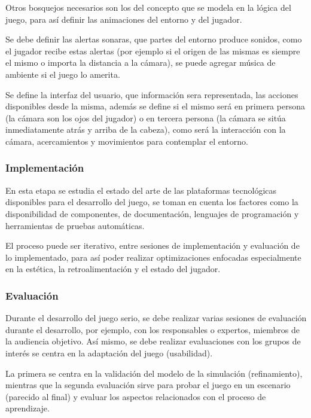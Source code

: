Otros bosquejos necesarios son los del concepto que se modela en la lógica del
juego, para así definir las animaciones del entorno y del jugador.

Se debe definir las alertas sonaras, que partes del entorno produce sonidos,
como el jugador recibe estas alertas (por ejemplo si el origen de las mismas es
siempre el mismo o importa la distancia a la cámara), se puede agregar música de
ambiente si el juego lo amerita.

Se define la interfaz del usuario, que información sera representada, las
acciones disponibles desde la misma, además se define si el mismo será en
primera persona (la cámara son los ojos del jugador) o en tercera persona (la
cámara se sitúa inmediatamente atrás y arriba de la cabeza), como será la
interacción con la cámara, acercamientos y movimientos para contemplar el
entorno.

\subsubsection{Implementación} 

En esta etapa se estudia el estado del arte de las plataformas tecnológicas
disponibles para el desarrollo del juego, se toman en cuenta los factores como
la disponibilidad de componentes, de documentación, lenguajes de programación y
herramientas de pruebas automáticas.

El proceso puede ser iterativo, entre sesiones de implementación y evaluación de
lo implementado, para así poder realizar optimizaciones enfocadas especialmente
en la estética, la retroalimentación y el estado del jugador.

\subsubsection{Evaluación} 

Durante el desarrollo del juego serio, se debe realizar varias sesiones de
evaluación durante el desarrollo, por ejemplo, con los responsables o expertos,
miembros de la audiencia objetivo. Así mismo, se debe realizar evaluaciones con
los grupos de interés se centra en la adaptación del juego (usabilidad). 

La primera se centra en la validación del modelo de la simulación
(refinamiento), mientras que la segunda evaluación sirve para probar el juego en
un escenario (parecido al final) y evaluar los aspectos relacionados con el
proceso de aprendizaje.

